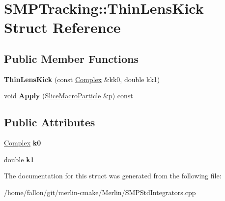 \hypertarget{structSMPTracking_1_1ThinLensKick}{}\section{S\+M\+P\+Tracking\+:\+:Thin\+Lens\+Kick Struct Reference}
\label{structSMPTracking_1_1ThinLensKick}
\subsection*{Public Member Functions}
\begin{DoxyCompactItemize}
\item 
\mbox{\label{structSMPTracking_1_1ThinLensKick_a8ecf4ed8b111d0066abd9960e431830e}} 
{\bfseries Thin\+Lens\+Kick} (const \hyperlink{classComplex}{Complex} \&kk0, double kk1)
\item 
\mbox{\label{structSMPTracking_1_1ThinLensKick_abc25bf15f1c05dd9c9d9e8d395fa2a90}} 
void {\bfseries Apply} (\hyperlink{classSMPTracking_1_1SliceMacroParticle}{Slice\+Macro\+Particle} \&p) const
\end{DoxyCompactItemize}
\subsection*{Public Attributes}
\begin{DoxyCompactItemize}
\item 
\mbox{\label{structSMPTracking_1_1ThinLensKick_a75479645b3c47558173536a45cec7064}} 
\hyperlink{classComplex}{Complex} {\bfseries k0}
\item 
\mbox{\label{structSMPTracking_1_1ThinLensKick_a6196cad7424984b49e4eddd4ea906562}} 
double {\bfseries k1}
\end{DoxyCompactItemize}


The documentation for this struct was generated from the following file\+:\begin{DoxyCompactItemize}
\item 
/home/fallon/git/merlin-\/cmake/\+Merlin/S\+M\+P\+Std\+Integrators.\+cpp\end{DoxyCompactItemize}
